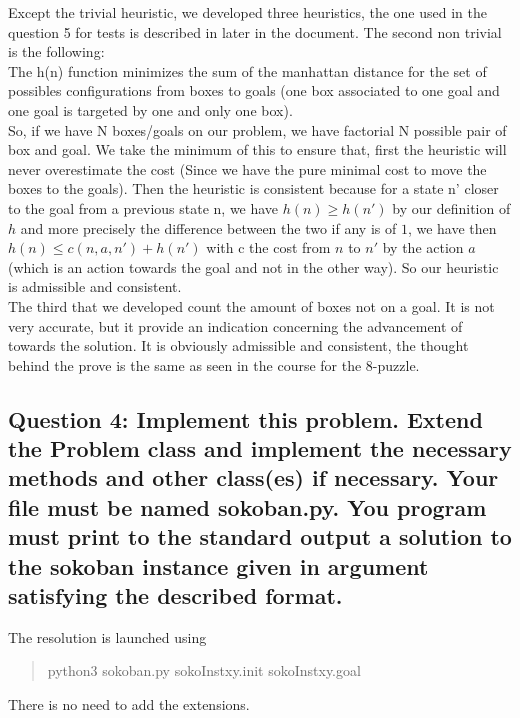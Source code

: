\documentclass[a4paper,10pt]{article}
\begin{document}
		Except the trivial heuristic, we developed three heuristics, the one used in the question 5 for tests is described in later in the document.
		The second non trivial is the following:\\ 		
		
		The h(n) function minimizes the sum of the manhattan distance for the set of possibles configurations from boxes to goals (one box associated to one goal and one goal is targeted by one and only one box). \\
		So, if we have N boxes/goals on our problem, we have factorial N possible pair of box and goal. We take the minimum of this to ensure that, first the heuristic will never overestimate the cost (Since we have the pure minimal cost to move the boxes to the goals). Then the heuristic is consistent because for a state n' closer to the goal from a previous state n, we have $ h(n) \geq h(n')$ by our definition of $h$ and more precisely the difference between the two if any is of $1$, we have then $h(n) \leq c(n,a,n')+h(n')$ with c the cost from $n$ to $n'$ by the action $a$ (which is an action towards the goal and not in the other way). So our heuristic is admissible and consistent.\\
		
		The third that we developed count the amount of boxes not on a goal. It is not very accurate, but it provide an indication concerning the advancement of towards the solution. It is obviously admissible and consistent, the thought behind the prove is the same as seen in the course for the 8-puzzle.
		
		
		\subsection{Question 4: Implement this problem. Extend the Problem class and implement the necessary methods and other class(es) if necessary. Your file must be named sokoban.py. You program must print to the standard output a solution to the sokoban instance given in argument satisfying the described format.}
			The resolution is launched using 
			\begin{quote}
				python3 sokoban.py sokoInstxy.init sokoInstxy.goal
			\end{quote}
			There is no need to add the extensions.
\end{document}
